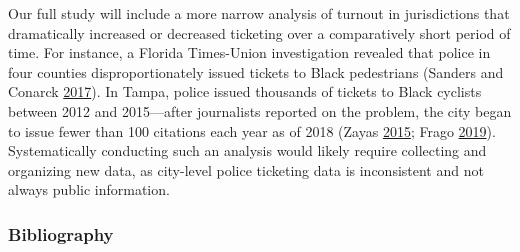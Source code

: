 \documentclass[
  12pt,
]{article}
\begin{document}
Our full study will include a more narrow analysis of turnout in jurisdictions that dramatically increased or decreased ticketing over a comparatively short period of time. For instance, a Florida Times-Union investigation revealed that police in four counties disproportionately issued tickets to Black pedestrians (Sanders and Conarck \protect\hyperlink{ref-Sanders2017}{2017}). In Tampa, police issued thousands of tickets to Black cyclists between 2012 and 2015---after journalists reported on the problem, the city began to issue fewer than 100 citations each year as of 2018 (Zayas \protect\hyperlink{ref-Zayas2015}{2015}; Frago \protect\hyperlink{ref-Frago2019}{2019}). Systematically conducting such an analysis would likely require collecting and organizing new data, as city-level police ticketing data is inconsistent and not always public information.

\newpage

\hypertarget{bibliography}{%
\subsubsection*{Bibliography}\label{bibliography}}
\end{document}
